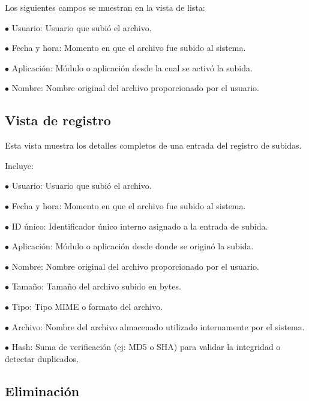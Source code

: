 \documentclass[a4paper]{article}
\begin{document}
Los siguientes campos se muestran en la vista de lista:

\begin{compactitem}
\item[\color{myblue}$\bullet$] Usuario: Usuario que subió el archivo.
\item[\color{myblue}$\bullet$] Fecha y hora: Momento en que el archivo fue subido al sistema.
\item[\color{myblue}$\bullet$] Aplicación: Módulo o aplicación desde la cual se activó la subida.
\item[\color{myblue}$\bullet$] Nombre: Nombre original del archivo proporcionado por el usuario.
\end{compactitem}

\hypertarget{toc39}{}
\subsection{Vista de registro}

Esta vista muestra los detalles completos de una entrada del registro de subidas.

Incluye:

\begin{compactitem}
\item[\color{myblue}$\bullet$] Usuario: Usuario que subió el archivo.
\item[\color{myblue}$\bullet$] Fecha y hora: Momento en que el archivo fue subido al sistema.
\item[\color{myblue}$\bullet$] ID único: Identificador único interno asignado a la entrada de subida.
\item[\color{myblue}$\bullet$] Aplicación: Módulo o aplicación desde donde se originó la subida.
\item[\color{myblue}$\bullet$] Nombre: Nombre original del archivo proporcionado por el usuario.
\item[\color{myblue}$\bullet$] Tamaño: Tamaño del archivo subido en bytes.
\item[\color{myblue}$\bullet$] Tipo: Tipo MIME o formato del archivo.
\item[\color{myblue}$\bullet$] Archivo: Nombre del archivo almacenado utilizado internamente por el sistema.
\item[\color{myblue}$\bullet$] Hash: Suma de verificación (ej: MD5 o SHA) para validar la integridad o detectar duplicados.
\end{compactitem}

\hypertarget{toc40}{}
\subsection{Eliminación}
\end{document}
